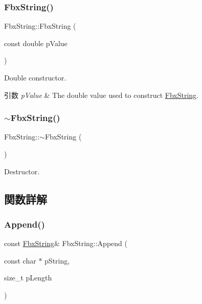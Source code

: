 \subsubsection{\texorpdfstring{Fbx\+String()}{FbxString()}\hspace{0.1cm}{\footnotesize\ttfamily [8/8]}}
{\footnotesize\ttfamily Fbx\+String\+::\+Fbx\+String (\begin{DoxyParamCaption}\item[{const double}]{p\+Value }\end{DoxyParamCaption})}

Double constructor. 
\begin{DoxyParams}{引数}
{\em p\+Value} & The double value used to construct \hyperlink{class_fbx_string}{Fbx\+String}. \\
\hline
\end{DoxyParams}
\mbox{\label{class_fbx_string_a36df0b9249f7987f157291b6246b7662}} 
\subsubsection{\texorpdfstring{$\sim$\+Fbx\+String()}{~FbxString()}}
{\footnotesize\ttfamily Fbx\+String\+::$\sim$\+Fbx\+String (\begin{DoxyParamCaption}{ }\end{DoxyParamCaption})}



Destructor. 



\subsection{関数詳解}
\mbox{\label{class_fbx_string_a83fddd51fd69fee3f9dbde0e2caf6e94}} 
\subsubsection{\texorpdfstring{Append()}{Append()}}
{\footnotesize\ttfamily const \hyperlink{class_fbx_string}{Fbx\+String}\& Fbx\+String\+::\+Append (\begin{DoxyParamCaption}\item[{const char $\ast$}]{p\+String,  }\item[{size\+\_\+t}]{p\+Length }\end{DoxyParamCaption})}

